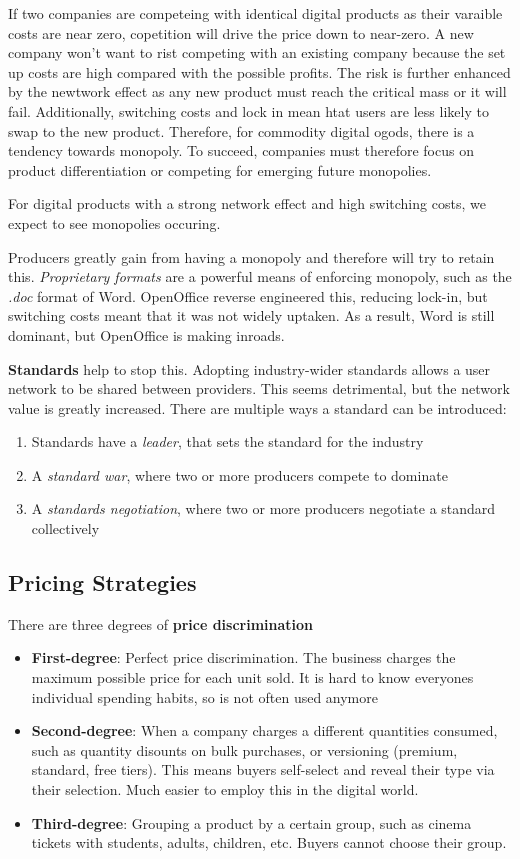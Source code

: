 \documentclass[11pt,a4paper,titlepage,dvipsnames,cmyk]{scrartcl}
\begin{document}
If two companies are competeing with identical digital products as their varaible costs are near zero, copetition will drive the price down to near-zero. A new company won't want to rist competing with an existing company because the set up costs are high compared with the possible profits. The risk is further enhanced by the newtwork effect as any new product must reach the critical mass or it will fail. Additionally, switching costs and lock in mean htat users are less likely to swap to the new product. Therefore, for commodity digital ogods, there is a tendency towards monopoly. To succeed, companies must therefore focus on product differentiation or competing for emerging future monopolies.

For digital products with a strong network effect and high switching costs, we expect to see monopolies occuring.

Producers greatly gain from having a monopoly and therefore will try to retain this. \textit{Proprietary formats} are a powerful means of enforcing monopoly, such as the \textit{.doc} format of Word. OpenOffice reverse engineered this, reducing lock-in, but switching costs meant that it was not widely uptaken. As a result, Word is still dominant, but OpenOffice is making inroads.

\textbf{Standards} help to stop this. Adopting industry-wider standards allows a user network to be shared between providers. This seems detrimental, but the network value is greatly increased. There are multiple ways a standard can be introduced:
\begin{enumerate}
\item Standards have a \textit{leader}, that sets the standard for the industry
\item A \textit{standard war}, where two or more producers compete to dominate
\item A \textit{standards negotiation}, where two or more producers negotiate a standard collectively
\end{enumerate}

\subsection{Pricing Strategies}
There are three degrees of \textbf{price discrimination}
\begin{itemize}
    \item \textbf{First-degree}: Perfect price discrimination. The business charges the maximum possible price for each unit sold. It is hard to know everyones individual spending habits, so is not often used anymore
    \item \textbf{Second-degree}: When a company charges a different quantities consumed, such as quantity disounts on bulk purchases, or versioning (premium, standard, free tiers). This means buyers self-select and reveal their type via their selection. Much easier to employ this in the digital world.
    \item \textbf{Third-degree}: Grouping a product by a certain group, such as cinema tickets with students, adults, children, etc. Buyers cannot choose their group.
\end{itemize}
\end{document}
